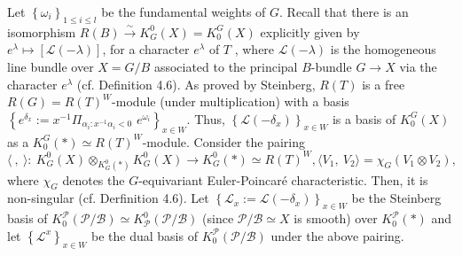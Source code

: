 \documentclass{article}
\def\L{\mathcal{L}}
\def\P{\mathcal{P}}
\def\B{\mathcal{B}}
\def\ref#1{#1}
\begin{document}
Let $\left\{\omega_i\right\}_{1\leq i\leq l}$ be the fundamental weights of $G$. 
Recall that there is an isomorphism  $R(B)\xrightarrow{\sim} K^0_G(X)= K_0^G (X)$ explicitly given by
$e^\lambda \mapsto \left[\L\left(-\lambda\right)\right]$,  for a character $e^\lambda$ of $T$ ,
 where $\L\left(-\lambda\right)$ is the homogeneous line bundle over $X=G/B$ associated to the principal $B$-bundle $G\rightarrow X$ via the character $e^\lambda$ (cf. Definition \ref{4.6}). 
 As proved by Steinberg, $R(T)$ is a free $R(G)= R(T)^W$-module (under multiplication) with a basis
$
\left\{ e^{\delta_x} := x^{-1} \Pi_{\alpha_i: x^{-1} \alpha_i <0} \,\,e^{\omega_i}\right\}_{x\in W}.
$
Thus, $\left\{\L\left(-\delta_x\right)\right\}_{x\in W}$ is a basis of $K_0^G (X)$
as a $K_0^G (*)\simeq R(T) ^W$-module. 
Consider the pairing 
$$
\langle~,~\rangle :~ K_G^0 \left(X\right) \otimes_{K_G^0 \left(*\right) } K_G^0 \left(X\right)  \rightarrow K_G^0 \left(*\right) \simeq R(T)^W, 
\langle V_1,~V_2\rangle= \chi_G\left(V_1\otimes V_2\right),
$$
where $\chi_G$ denotes the $G$-equivariant Euler-Poincar\'e characteristic. 
Then, it is non-singular (cf. Derfinition \ref{4.6}).
Let $\left\{\L_x:=\L\left(-\delta_x\right)\right\}_{x\in W}$ be the Steinberg basis of $K_0^\P\left(\P/\B\right)\simeq K_\P^0\left(\P/\B\right)$ (since $\P/\B \simeq X$ is smooth) over $K_0^\P (*)$ and 
let $\left\{\L^x\right\}_{x\in W}$ be the dual basis of $K_0^\P\left(\P/\B\right)$ under the above pairing.
\end{document}
